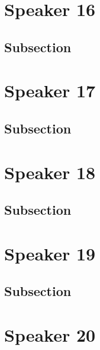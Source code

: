 \documentclass[
]{book}
\begin{document}
\hypertarget{speaker-16}{%
\chapter*{Speaker 16}\label{speaker-16}}

\hypertarget{subsection-9}{%
\section{Subsection}\label{subsection-9}}

\hypertarget{speaker-17}{%
\chapter*{Speaker 17}\label{speaker-17}}

\hypertarget{subsection-10}{%
\section{Subsection}\label{subsection-10}}

\hypertarget{speaker-18}{%
\chapter*{Speaker 18}\label{speaker-18}}

\hypertarget{subsection-11}{%
\section{Subsection}\label{subsection-11}}

\hypertarget{speaker-19}{%
\chapter*{Speaker 19}\label{speaker-19}}

\hypertarget{subsection-12}{%
\section{Subsection}\label{subsection-12}}

\hypertarget{speaker-20}{%
\chapter*{Speaker 20}\label{speaker-20}}
\end{document}
